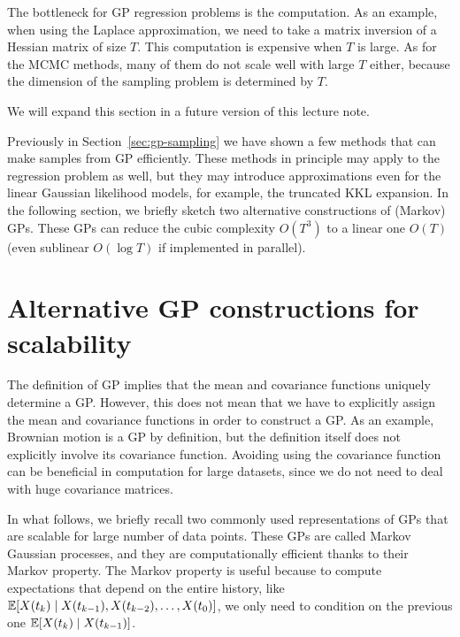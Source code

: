 \documentclass[]{article}
\begin{document}
The bottleneck for GP regression problems is the computation. As an example, when using the Laplace approximation, we need to take a matrix inversion of a Hessian matrix of size $T$. This computation is expensive when $T$ is large. As for the MCMC methods, many of them do not scale well with large $T$ either, because the dimension of the sampling problem is determined by $T$.

We will expand this section in a future version of this lecture note.

Previously in Section~\ref{sec:gp-sampling} we have shown a few methods that can make samples from GP efficiently. These methods in principle may apply to the regression problem as well, but they may introduce approximations even for the linear Gaussian likelihood models, for example, the truncated KKL expansion. In the following section, we briefly sketch two alternative constructions of (Markov) GPs. These GPs can reduce the cubic complexity $O(T^3)$ to a linear one $O(T)$ (even sublinear $O(\log T)$ if implemented in parallel).

\section{Alternative GP constructions for scalability}
\label{sec:gp-markov}
The definition of GP implies that the mean and covariance functions uniquely determine a GP. However, this does not mean that we have to explicitly assign the mean and covariance functions in order to construct a GP. As an example, Brownian motion is a GP by definition, but the definition itself does not explicitly involve its covariance function. Avoiding using the covariance function can be beneficial in computation for large datasets, since we do not need to deal with huge covariance matrices.

In what follows, we briefly recall two commonly used representations of GPs that are scalable for large number of data points. These GPs are called Markov Gaussian processes, and they are computationally efficient thanks to their Markov property. The Markov property is useful because to compute expectations that depend on the entire history, like $\expec{X(t_k) \cond X(t_{k-1}), X(t_{k-2}), \allowbreak\ldots, X(t_0)}$, we only need to condition on the previous one $\expec{X(t_k) \cond X(t_{k-1})}$.
\end{document}
